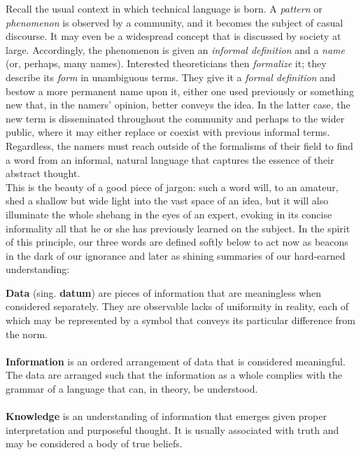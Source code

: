 Recall the usual context in which technical language is born. A \textit{pattern} or \textit{phenomenon} is observed by a community, and it becomes the subject of casual discourse. It may even be a widespread concept that is discussed by society at large. Accordingly, the phenomenon is given an \textit{informal definition} and a \textit{name} (or, perhaps, many names). Interested theoreticians then \textit{formalize} it; they describe its \textit{form} in unambiguous terms. They give it a \textit{formal definition} and bestow a more permanent name upon it, either one used previously or something new that, in the namers' opinion, better conveys the idea. In the latter case, the new term is disseminated throughout the community and perhaps to the wider public, where it may either replace or coexist with previous informal terms. Regardless, the namers must reach outside of the formalisms of their field to find a word from an informal, natural language that captures the essence of their abstract thought. \\

This is the beauty of a good piece of jargon: such a word will, to an amateur, shed a shallow but wide light into the vast space of an idea, but it will also illuminate the whole shebang in the eyes of an expert, evoking in its concise informality all that he or she has previously learned on the subject. In the spirit of this principle, our three words are defined softly below to act now as beacons in the dark of our ignorance and later as shining summaries of our hard-earned understanding: \\

\begin{displayquote}
	\textbf{Data} (sing. \textbf{datum}) are pieces of information that are meaningless when considered separately. They are observable lacks of uniformity in reality, each of which may be represented by a symbol that conveys its particular difference from the norm. \\~\\
	\textbf{Information} is an ordered arrangement of data that is considered meaningful. The data are arranged such that the information as a whole complies with the grammar of a language that can, in theory, be understood. \\~\\
	\textbf{Knowledge} is an understanding of information that emerges given proper interpretation and purposeful thought. It is usually associated with truth and may be considered a body of true beliefs. \\
\end{displayquote}

